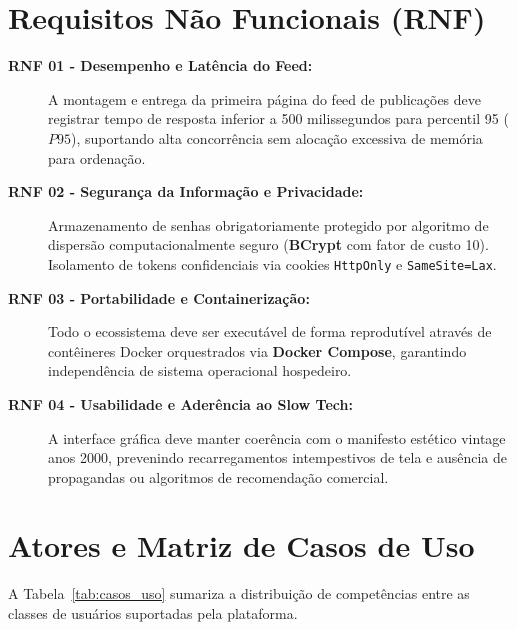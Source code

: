 \documentclass[12pt,a4paper]{report}
\begin{document}
\section{Requisitos Não Funcionais (RNF)}
\begin{description}
    \item[\textbf{RNF 01 - Desempenho e Latência do Feed:}] A montagem e entrega da primeira página do feed de publicações deve registrar tempo de resposta inferior a 500 milissegundos para percentil 95 ($P95$), suportando alta concorrência sem alocação excessiva de memória para ordenação.
    
    \item[\textbf{RNF 02 - Segurança da Informação e Privacidade:}] Armazenamento de senhas obrigatoriamente protegido por algoritmo de dispersão computacionalmente seguro (\textbf{BCrypt} com fator de custo 10). Isolamento de tokens confidenciais via cookies \texttt{HttpOnly} e \texttt{SameSite=Lax}.
    
    \item[\textbf{RNF 03 - Portabilidade e Containerização:}] Todo o ecossistema deve ser executável de forma reprodutível através de contêineres Docker orquestrados via \textbf{Docker Compose}, garantindo independência de sistema operacional hospedeiro.
    
    \item[\textbf{RNF 04 - Usabilidade e Aderência ao Slow Tech:}] A interface gráfica deve manter coerência com o manifesto estético vintage anos 2000, prevenindo recarregamentos intempestivos de tela e ausência de propagandas ou algoritmos de recomendação comercial.
\end{description}

\section{Atores e Matriz de Casos de Uso}
A Tabela~\ref{tab:casos_uso} sumariza a distribuição de competências entre as classes de usuários suportadas pela plataforma.
\end{document}
